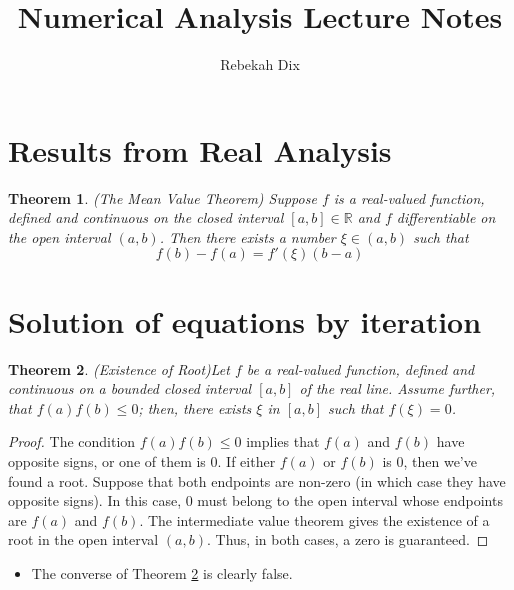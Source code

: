 \documentclass[12pt]{article}
\title{Numerical Analysis Lecture Notes}
\author{Rebekah Dix}
\newtheorem{theorem}{Theorem}
\theoremstyle{definition}
\newcommand{\R}{\mathbb{R}}
\begin{document}
\maketitle
\tableofcontents
\newpage 

\section{Results from Real Analysis}
\begin{theorem}(The Mean Value Theorem)
Suppose $f$ is a real-valued function, defined and continuous on the closed interval $[a,b] \in \R$ and $f$ differentiable on the open interval $(a,b)$. Then there exists a number $\xi \in (a,b)$ such that
\begin{equation}
	f(b) - f(a) = f'(\xi) (b - a)
\end{equation}
\end{theorem}

\section{Solution of equations by iteration}

\begin{theorem}(Existence of Root)\label{zeroexists}
Let $f$ be a real-valued function, defined and continuous on a bounded closed interval $[a,b]$ of the real line. Assume further, that $f(a)f(b) \leq 0$; then, there exists $\xi$ in $[a,b]$ such that $f(\xi) = 0$.
\end{theorem}
\begin{proof}
The condition $f(a)f(b) \leq 0$ implies that $f(a)$ and $f(b)$ have opposite signs, or one of them is $0$. If either $f(a)$ or $f(b)$ is $0$, then we've found a root. Suppose that both endpoints are non-zero (in which case they have opposite signs). In this case, $0$ must belong to the open interval whose endpoints are $f(a)$ and $f(b)$. The intermediate value theorem gives the existence of a root in the open interval $(a,b)$. Thus, in both cases, a zero is guaranteed. 
\end{proof}

\begin{itemize}
\item The converse of Theorem \ref{zeroexists} is clearly false.
\end{itemize}
\end{document}
